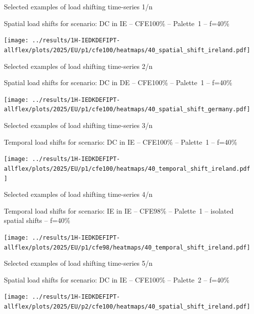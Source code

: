 

\begin{frame}{Selected examples of load shifting time-series 1/n}

  {\footnotesize
  \centering

  Spatial load shifts for scenario: DC in IE -- CFE100\% -- Palette~1 -- f=40\% 

  \texttt{[image: ../results/1H-IEDKDEFIPT-allflex/plots/2025/EU/p1/cfe100/heatmaps/40\_spatial\_shift\_ireland.pdf]}
  }
  
\end{frame}


\begin{frame}{Selected examples of load shifting time-series 2/n}

  {\footnotesize
  \centering

  Spatial load shifts for scenario: DC in DE -- CFE100\% -- Palette~1 -- f=40\% 

  \texttt{[image: ../results/1H-IEDKDEFIPT-allflex/plots/2025/EU/p1/cfe100/heatmaps/40\_spatial\_shift\_germany.pdf]}
  }
  
\end{frame}


\begin{frame}{Selected examples of load shifting time-series 3/n}

  {\footnotesize
  \centering

  Temporal load shifts for scenario: DC in IE -- CFE100\% -- Palette~1 -- f=40\% 

  \texttt{[image: ../results/1H-IEDKDEFIPT-allflex/plots/2025/EU/p1/cfe100/heatmaps/40\_temporal\_shift\_ireland.pdf]}
  }
  
\end{frame}


\begin{frame}{Selected examples of load shifting time-series 4/n}

  {\footnotesize
  \centering

  Temporal load shifts for scenario: IE in IE -- CFE98\% -- Palette~1 -- isolated spatial shifts -- f=40\% 

  \texttt{[image: ../results/1H-IEDKDEFIPT-allflex/plots/2025/EU/p1/cfe98/heatmaps/40\_temporal\_shift\_ireland.pdf]}
  }
  
\end{frame}


\begin{frame}{Selected examples of load shifting time-series 5/n}

  {\footnotesize
  \centering

  Spatial load shifts for scenario: DC in IE -- CFE100\% -- Palette~2 -- f=40\% 

  \texttt{[image: ../results/1H-IEDKDEFIPT-allflex/plots/2025/EU/p2/cfe100/heatmaps/40\_spatial\_shift\_ireland.pdf]}
  }
  
\end{frame}


